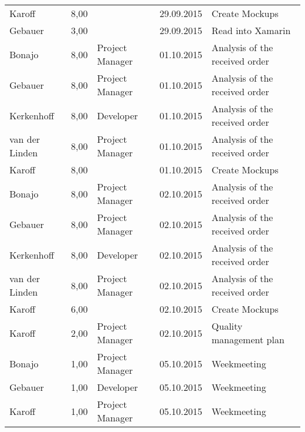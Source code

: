 \begin{longtable}{ l r p{2cm} c p{4cm} }
		Karoff                  & 8,00           &                 & 29.09.2015    & Create Mockups                               \\
		Gebauer                 & 3,00           &                 & 29.09.2015    & Read into Xamarin                            \\
		Bonajo                  & 8,00           & Project Manager & 01.10.2015    & Analysis of the received order               \\
		Gebauer                 & 8,00           & Project Manager & 01.10.2015    & Analysis of the received order               \\
		Kerkenhoff              & 8,00           & Developer       & 01.10.2015    & Analysis of the received order               \\
		van der Linden          & 8,00           & Project Manager & 01.10.2015    & Analysis of the received order               \\
		Karoff                  & 8,00           &                 & 01.10.2015    & Create Mockups                               \\
		Bonajo                  & 8,00           & Project Manager & 02.10.2015    & Analysis of the received order               \\
		Gebauer                 & 8,00           & Project Manager & 02.10.2015    & Analysis of the received order               \\
		Kerkenhoff              & 8,00           & Developer       & 02.10.2015    & Analysis of the received order               \\
		van der Linden          & 8,00           & Project Manager & 02.10.2015    & Analysis of the received order               \\
		Karoff                  & 6,00           &                 & 02.10.2015    & Create Mockups                               \\
		Karoff                  & 2,00           & Project Manager & 02.10.2015    & Quality management plan                      \\
		Bonajo                  & 1,00           & Project Manager & 05.10.2015    & Weekmeeting                                  \\
		Gebauer                 & 1,00           & Developer       & 05.10.2015    & Weekmeeting                                  \\
		Karoff                  & 1,00           & Project Manager & 05.10.2015    & Weekmeeting                                  \\

\end{longtable}
